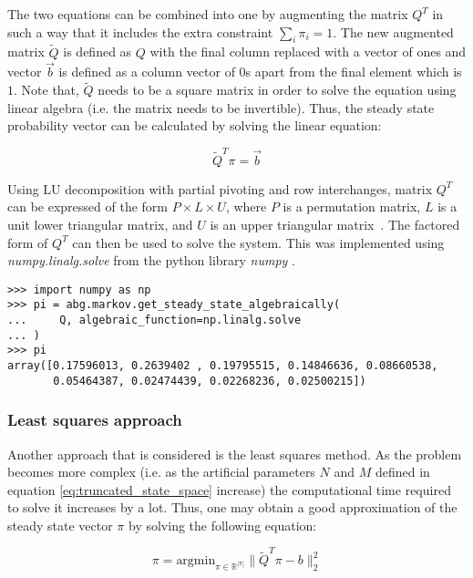 The two equations can be combined into one by augmenting the matrix \( Q^T \)
in such a way that it includes the extra constraint \( \sum_i \pi_i = 1 \).
The new augmented matrix \(\tilde Q\) is defined as \(Q\) with the final
column replaced with a vector of ones and vector \(\vec{b}\) is defined
as a column vector of \(0\)s apart from the final element which is \(1\).
Note that, \(\tilde Q\) needs to be a square matrix in order to solve the
equation using linear algebra (i.e. the matrix needs to be invertible).
Thus, the steady state probability vector can be calculated by solving the
linear equation:

\begin{equation}
    \tilde Q^T \pi = \vec{b}
\end{equation}

Using LU decomposition with partial pivoting and row interchanges, matrix
\(Q^T\) can be expressed of the form \(P \times L \times U\), where \(P\) is
a permutation matrix, \(L\) is a unit lower triangular matrix, and \(U\) is
an upper triangular matrix~\cite{strang2006linear}.
The factored form of \(Q^T\) can then be used to solve the system.
This was implemented using \textit{numpy.linalg.solve} from the
python library \textit{numpy} \cite{2020NumPy-Array} \cite{lapack99}.


\begin{lstlisting}[style=pystyle]
>>> import numpy as np
>>> pi = abg.markov.get_steady_state_algebraically(
...     Q, algebraic_function=np.linalg.solve
... )
>>> pi
array([0.17596013, 0.2639402 , 0.19795515, 0.14846636, 0.08660538,
       0.05464387, 0.02474439, 0.02268236, 0.02500215])

\end{lstlisting}


\subsubsection{Least squares approach}

Another approach that is considered is the least squares method.
As the problem becomes more complex (i.e. as the artificial parameters \(N\)
and \(M\) defined in equation \ref{eq:truncated_state_space} increase)
the computational time required to solve it increases by a lot.
Thus, one may obtain a good approximation of the steady state vector \( \pi \)
by solving the following equation:

\begin{equation}
    \pi = \text{argmin}_{\pi \in \mathbb{R}^{|\pi|}}\|\tilde Q^T \pi - b\|_2^2
\end{equation}

